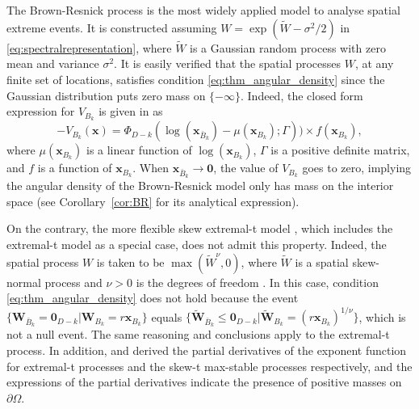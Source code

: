 \documentclass[lineno]{biometrika}
\begin{document}
The Brown-Resnick process is the most widely applied model to analyse spatial extreme events.
It is constructed assuming $W=\exp(\tilde W - \sigma^2/2)$ in \eqref{eq:spectralrepresentation}, where $\tilde W$ is a Gaussian random process with zero mean and variance $\sigma^2$. It is easily verified that the spatial processes $W$, at any finite set of locations, satisfies condition \eqref{eq:thm_angular_density} since the Gaussian distribution puts zero mass on $\{-\infty\}$. Indeed, the closed form expression for $V_{B_k}$ is given in \cite{Wadsworth.Tawn:2014} as
$$-V_{B_k}(\bm x) = \Phi_{D-k}(\log(\bm x_{\bar{B}_k}) - \mu(\bm x_{B_k});\Gamma))\times f(\bm x_{B_k}),$$
where $\mu(\bm x_{B_k})$ is a linear function of $\log(\bm x_{B_k})$, $\Gamma$ is a positive definite matrix, and $f$ is a function of $\bm x_{B_k}$. When $\bm x_{\bar{B}_k}\to \bm 0$, the value of $V_{B_k}$ goes to zero, implying the angular density of the Brown-Resnick model only has mass on the interior space (see Corollary~\ref{cor:BR} for its analytical expression).

On the contrary, the more flexible skew extremal-t model \citep{Beranger.etal:2017}, which includes the extremal-t model \citep{Opitz:2013} as a special case, does not admit this property. Indeed, the spatial process $W$ is taken to be $\max(\tilde W^\nu,0)$, where $\tilde W$ is a spatial skew-normal process and $\nu>0$ is the degrees of freedom \citep{Beranger.etal:2017}. In this case, condition \eqref{eq:thm_angular_density} does not hold because the event $\{\bm W_{\bar{B}_k} = \bm 0_{D-k} | \bm W_{B_k} = r \bm x_{B_k} \}$ equals $\{\tilde{\bm W}_{\bar{B}_k} \leq \bm 0_{D-k} | \tilde{\bm W}_{B_k} = (r \bm x_{B_k})^{1/\nu} \}$, which is not a null event. The same reasoning and conclusions apply to the extremal-t process. In addition, \cite{Thibaud.Opitz:2015} and \cite{Beranger.etal:2021} derived the partial derivatives of the exponent function for extremal-t processes and the skew-t max-stable processes respectively, and the expressions of the partial derivatives indicate the presence of positive masses on $\partial\Omega$. 
\end{document}
